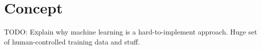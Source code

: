 %
\section{Concept}
\label{sec_concept}

TODO: Explain why machine learning is a hard-to-implement approach. Huge set of human-controlled training data and stuff.